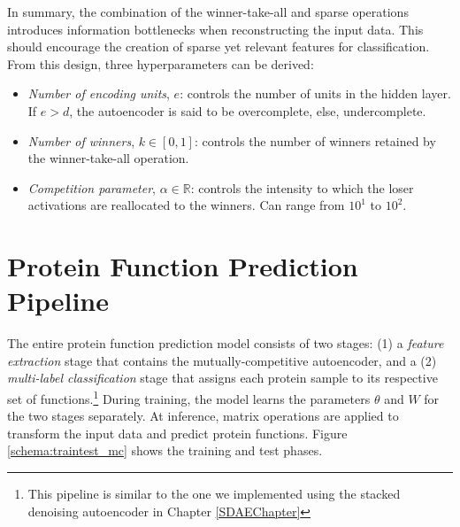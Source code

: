 \par In summary, the combination of the winner-take-all and sparse operations
introduces information bottlenecks when reconstructing the input data. This
should encourage the creation of sparse yet relevant features for
classification. From this design, three hyperparameters can be derived:


\begin{itemize}
  \item \textit{Number of encoding units}, $e$: controls the number of units
  in the hidden layer. If $e > d$, the autoencoder is said to be
  overcomplete, else, undercomplete.
  \item \textit{Number of winners}, $k \in \left[0,1\right]$: controls the
  number of winners retained by the winner-take-all operation.
  \item \textit{Competition parameter}, $\alpha \in \mathbb{R}$: controls the
  intensity to which the loser activations are reallocated to the winners.
  Can range from $10^{1}$ to $10^{2}$.
\end{itemize}

\vspace*{-10pt}


\section{Protein Function Prediction Pipeline}
\label{PFPPipeline}

\par The entire protein function prediction model consists of two stages: (1)
a \textit{feature extraction} stage that contains the mutually-competitive
autoencoder, and a (2) \textit{multi-label classification} stage that assigns
each protein sample to its respective set of functions.\footnote{This
pipeline is similar to the one we implemented using the stacked denoising
autoencoder in Chapter \ref{SDAEChapter}} During training, the model learns
the parameters $\theta$ and $W$ for the two stages separately. At inference,
matrix operations are applied to transform the input data and predict protein
functions. Figure \ref{schema:traintest_mc} shows the training and test
phases.

